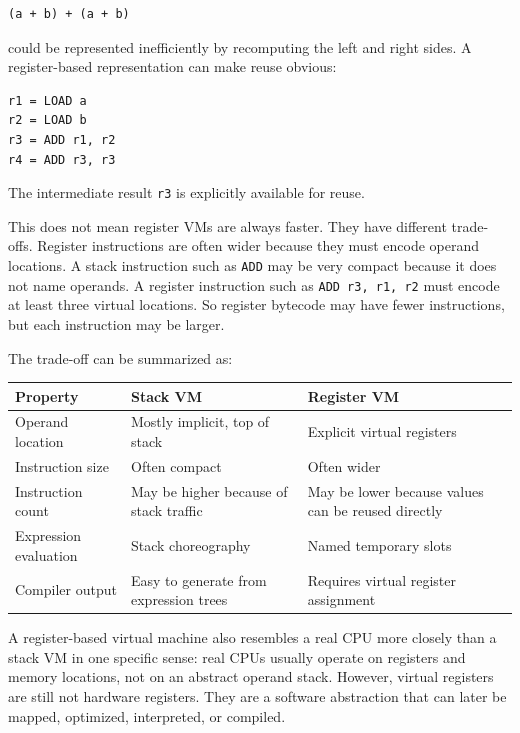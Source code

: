\documentclass[a4paper,twoside]{report}
\begin{document}
\begin{verbatim}
(a + b) + (a + b)
\end{verbatim}

could be represented inefficiently by recomputing the left and right sides. A register-based representation can make reuse obvious:

\begin{verbatim}
r1 = LOAD a
r2 = LOAD b
r3 = ADD r1, r2
r4 = ADD r3, r3
\end{verbatim}

The intermediate result \texttt{r3} is explicitly available for reuse.

This does not mean register VMs are always faster. They have different trade-offs. Register instructions are often wider because they must encode operand locations. A stack instruction such as \texttt{ADD} may be very compact because it does not name operands. A register instruction such as \texttt{ADD r3, r1, r2} must encode at least three virtual locations. So register bytecode may have fewer instructions, but each instruction may be larger.

The trade-off can be summarized as:

\begin{center}
\begin{tabular}{|p{}|p{}|p{}|}
\hline
\textbf{Property} & \textbf{Stack VM} & \textbf{Register VM} \\
\hline
Operand location & Mostly implicit, top of stack & Explicit virtual registers \\
\hline
Instruction size & Often compact & Often wider \\
\hline
Instruction count & May be higher because of stack traffic & May be lower because values can be reused directly \\
\hline
Expression evaluation & Stack choreography & Named temporary slots \\
\hline
Compiler output & Easy to generate from expression trees & Requires virtual register assignment \\
\hline
\end{tabular}
\end{center}

A register-based virtual machine also resembles a real CPU more closely than a stack VM in one specific sense: real CPUs usually operate on registers and memory locations, not on an abstract operand stack. However, virtual registers are still not hardware registers. They are a software abstraction that can later be mapped, optimized, interpreted, or compiled.
\end{document}
